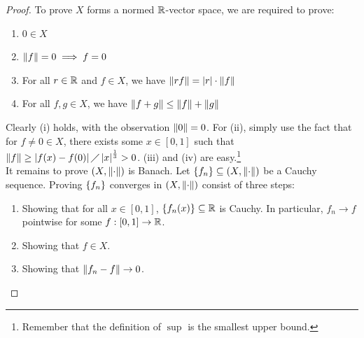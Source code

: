 \documentclass{report}
\begin{document}
\begin{proof}
To prove $X$ forms a normed $\mathbb{R}$-vector space, we are required to prove:  
\begin{enumerate}[label=(\roman*)]
  \item $ 0 \in X$ 
  \item $\left\| f \right\|=0 \implies f=0$ 
  \item For all $r \in \mathbb{R}$ and $f \in X$, we have $ \left\| rf \right\|= \left|r\right| \cdot \left\| f \right\|$ 
  \item For all $f,g \in X$, we have $\left\| f+g \right\|\leq \left\| f \right\|+\left\| g \right\|$   
\end{enumerate}
Clearly (i) holds, with the observation $\left\| 0 \right\|=0$. For (ii), simply use the fact that for $f\neq 0 \in X$, there exists some $x\in [0,1]$ such that $\left\| f \right\|\geq \left|f(x)-f(0)\right|\diagup \left|x\right|^{\frac{1}{3}}>0$. (iii) and (iv) are easy.\footnote{Remember that the definition of $\sup$ is the smallest upper bound.}  \\














It remains to prove $(X,\left\| \cdot \right\|)$ is Banach. Let $\left\{ f_n \right\} \subseteq (X, \left\| \cdot  \right\|)$ be a Cauchy sequence. Proving $\left\{ f_n \right\}$ converges in $(X,\left\| \cdot \right\|)$ consist of three steps: 
\begin{enumerate}[label=(\roman*)]
  \item Showing that for all $x\in [0,1]$, $\left\{ f_n(x) \right\}\subseteq \mathbb{R}$ is Cauchy. In particular, $f_n \rightarrow f$ pointwise for some $f:[0,1]\rightarrow \mathbb{R}$. 
  \item Showing that $f\in X$. 
  \item Showing that $\left\| f_n-f \right\|\rightarrow 0$. 
\end{enumerate}



\end{proof}
\end{document}

